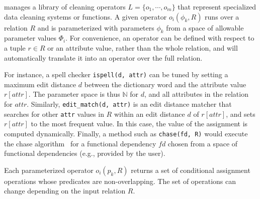 \sys manages a library of cleaning operators $L = \{o_1, \cdots, o_m\}$ that represent specialized data cleaning systems or functions.  A given operator $o_i(\phi_k, R)$ runs over a relation $R$ and is parameterized with parameters $\phi_k$ from a space of allowable parameter values $\Phi_i$.  For convenience, an operator can be defined with respect to a tuple $r\in R$  or an attribute value, rather than the whole relation, and \sys will automatically translate it into an operator over the full relation.

For instance, a spell checker  \texttt{ispell(d, attr)} can be tuned by setting a maximum edit distance $d$ between the dictionary word and the attribute value $r[attr]$.  The parameter space is thus $\mathbb{N}$ for $d$, and all attributes in the relation for $attr$. Similarly, \texttt{edit\_match(d, attr)} is an edit distance matcher that searches for other \texttt{attr} values in $R$ within an edit distance $d$ of $r[attr]$, and sets $r[attr]$ to the most frequent value.  In this case, the value of the assignment is computed dynamically.  Finally, a method such as \texttt{chase(fd, R)} would execute the chase algorithm~\cite{Deutsch2008TheCR} for a functional dependency $fd$ chosen from a space of functional dependencies (e.g., provided by the user).

Each parameterized operator $o_i(p_k, R)$ returns a set of conditional assignment operations whose predicates are non-overlapping.  The set of operations can change depending on the input relation $R$.   %



